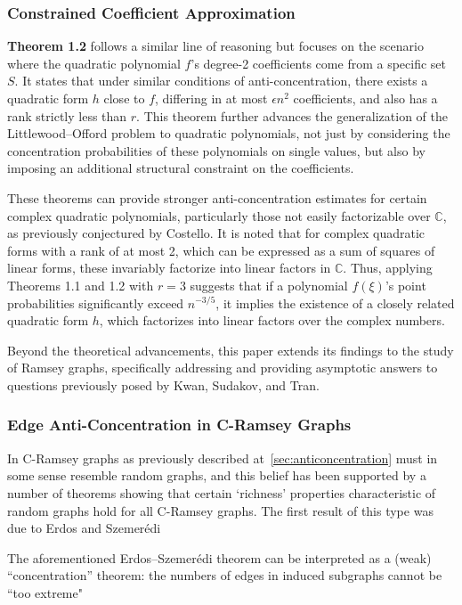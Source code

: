 \subsubsection{Constrained Coefficient Approximation}
\textbf{Theorem 1.2} follows a similar line of reasoning but
focuses on the scenario where the quadratic polynomial ${f}$'s 
degree-2 coefficients come from a specific set $S$. 
It states that under similar conditions of anti-concentration,
there exists a quadratic form $h$ close to ${f}$,
differing in at most $\epsilon n^2$ coefficients, 
and also has a rank strictly less than $r$. 
This theorem further advances the generalization of the 
Littlewood–Offord problem to quadratic polynomials,
not just by considering the concentration probabilities
of these polynomials on single values, but also by imposing
an additional structural constraint on the coefficients.

These theorems can provide stronger anti-concentration
estimates for certain complex quadratic polynomials,
particularly those not easily factorizable over $\mathbb{C}$,
as previously conjectured by Costello.
It is noted that for complex quadratic forms with a rank
of at most 2, which can be expressed as a sum of squares 
of linear forms, these invariably factorize into linear factors
in $\mathbb{C}$.
Thus, applying Theorems 1.1 and 1.2 with $r = 3$ suggests
that if a polynomial $f(\xi)$'s point probabilities
significantly exceed $n^{-3/5}$, it implies the existence 
of a closely related quadratic form $h$, which factorizes
into linear factors over the complex numbers.

Beyond the theoretical advancements, this paper extends
its findings to the study of Ramsey graphs,
specifically addressing and providing asymptotic 
answers to questions previously posed by Kwan, Sudakov, and Tran.

\subsubsection{Edge Anti-Concentration in C-Ramsey Graphs}
In C-Ramsey graphs as previously described at~\ref{sec:anticoncentration}
must in some sense resemble random graphs,
and this belief has been supported by a number of theorems
showing that certain `richness' properties
characteristic of random graphs hold for all C-Ramsey graphs.
The first result of this type was due
to Erdos and Szemerédi~\cite{erdHos1972ramsey}

The aforementioned Erdos–Szemerédi theorem can be
interpreted as a (weak) “concentration” theorem:
the numbers of edges in induced subgraphs cannot
be “too extreme"

